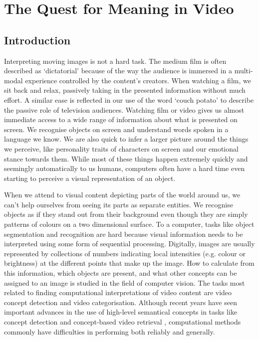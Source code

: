 \chapter{The Quest for Meaning in Video}
\label{ch:meaning_in_video}

\section{Introduction} %
\label{sec:meaning_in_video_introduction}

Interpreting moving images is not a hard task. The medium film is often described as `dictatorial' because of the way the audience is immersed in a multi-modal experience controlled by the content's creators. When watching a film, we sit back and relax, passively taking in the presented information without much effort. A similar ease is reflected in our use of the word `couch potato' to describe the passive role of television audiences. Watching film or video gives us almost immediate access to a wide range of information about what is presented on screen. We recognise objects on screen and understand words spoken in a language we know. We are also quick to infer a larger picture around the things we perceive, like personality traits of characters on screen and our emotional stance towards them. While most of these things happen extremely quickly and seemingly automatically to us humans, computers often have a hard time even starting to perceive a visual representation of an object.

When we attend to visual content depicting parts of the world around us, we can't help ourselves from seeing its parts as separate entities. We recognise objects as if they stand out from their background even though they are simply patterns of colours on a two dimensional surface. To a computer, tasks like object segmentation and recognition are hard because visual information needs to be interpreted using some form of sequential processing. Digitally, images are usually represented by collections of numbers indicating local intensities (e.g. colour or brightness) at the different points that make up the image. How to calculate from this information, which objects are present, and what other concepts can be assigned to an image is studied in the field of computer vision. The tasks most related to finding computational interpretations of video content are video concept detection and video categorisation. Although recent years have seen important advances in the use of high-level semantical concepts in tasks like concept detection and concept-based video retrieval \cite{Snoek:2009dq, Snoek:jf, Worring:2007vm, Chang:2008wh}, computational methods commonly have difficulties in performing both reliably and generally\cite{Urban:2006up, Snoek:2009dq}.

